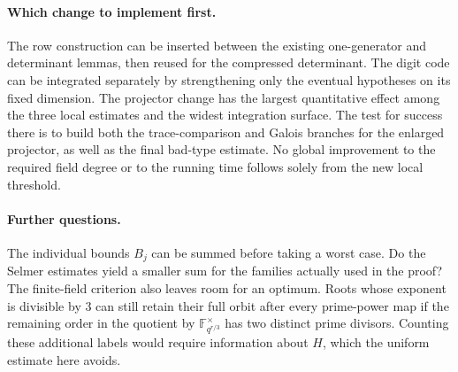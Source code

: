 \paragraph{Which change to implement first.}
The row construction can be inserted between the existing one-generator and determinant lemmas, then reused for the compressed determinant. The digit code can be integrated separately by strengthening only the eventual hypotheses on its fixed dimension. The projector change has the largest quantitative effect among the three local estimates and the widest integration surface. The test for success there is to build both the trace-comparison and Galois branches for the enlarged projector, as well as the final bad-type estimate. No global improvement to the required field degree or to the running time follows solely from the new local threshold.

\paragraph{Further questions.}
The individual bounds $B_j$ can be summed before taking a worst case. Do the Selmer estimates yield a smaller sum for the families actually used in the proof? The finite-field criterion also leaves room for an optimum. Roots whose exponent is divisible by $3$ can still retain their full orbit after every prime-power map if the remaining order in the quotient by $\mathbb F_{q^{r/3}}^\times$ has two distinct prime divisors. Counting these additional labels would require information about $H$, which the uniform estimate here avoids.

